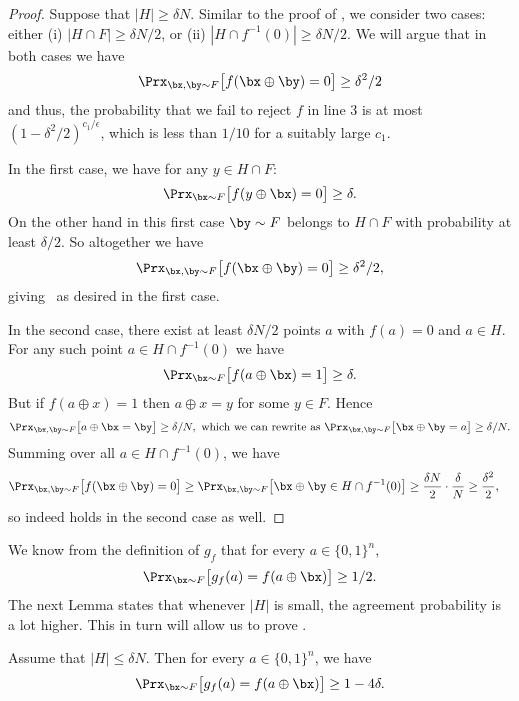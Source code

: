 \documentclass[11pt]{article}
\theoremstyle{definition}
\begin{document}
\begin{proof}
Suppose that $|H| \geq \delta  N$. Similar to the proof of  , we consider two cases: either (i)  $|H \cap F| \geq \delta N /2$, or
(ii) $|H \cap f^{-1}(0)| \geq \delta N /2$.
We will argue that in both cases we have
\begin{equation} \label{eq:xyz}
\Prx_{\bx,\by \sim F}\big[f(\bx \oplus \by)=0\big] \geq \delta^2/2
\end{equation}
and thus, the probability that we fail to reject $f$ in line $3$ is at most $(1-\delta^2/2)^{c_1/\epsilon}$, which is less than $1/10$ for a suitably large $c_1$.

In the first case, we have for any $y \in H \cap F$:
$$\Prx_{\bx \sim F}\big[f(y \oplus \bx)=0\big] \geq {\delta}.
$$ 
On the other hand in this first case $\by \sim F$ belongs to $H \cap F$ with probability at least ${\delta/2}$. So altogether we have 
$$\Prx_{\bx,\by \sim F}\big[f(\bx \oplus \by)=0\big] \geq \delta^2/2,$$
giving~ as desired in the first case.
    
In the second case, there exist at least $\delta N /2$ points $a$ with $f(a)=0$ and $a \in H$. For any such point $a \in H \cap f^{-1}(0)$ we have
    $$\Prx_{\bx \sim F}\big[f(a \oplus \bx)=1\big] \geq \delta.$$
    But if $f(a \oplus x)=1$ then $a \oplus x = y$ for some $y \in F$. Hence
    $$\Prx_{\bx, \by \sim F}\big[a \oplus \bx  = \by \big] \geq \delta/N,
\text{~which we can rewrite as~}
\Prx_{\bx,\by \sim F}\big[\bx \oplus \by = a \big] \geq \delta/N.$$
    Summing over all $a \in H \cap f^{-1}(0)$, we have 
\begin{align*}
    \Prx_{\bx,\by \sim F}\big[f(\bx \oplus \by)=0\big]
     &\ge \Prx_{\bx,\by \sim F}\big[ \bx \oplus \by\in H\cap f^{-1}(0)\big]\ge \frac{\delta N}{2}\cdot \frac{\delta}{N}\ge \frac{\delta^2}{2},\end{align*}
so indeed  holds in the second case as well.
\end{proof}






We know from the definition of $g_f$ that for every $a \in \{0,1\}^n$, $$\Prx_{\bx \sim F} \big[g_f(a)=f(a \oplus \bx)\big] \geq 1/2.$$
The next Lemma states that whenever $|H|$ is small, the agreement probability is a lot higher. This in turn will allow us to prove . 


\begin{lemma} 
\label{lem:amplification}
    Assume that $|H| \leq \delta N$. Then for every $a \in \{0,1\}^n$,  we have  
    $$\Prx_{\bx \sim F}\big[g_f(a) = f(a \oplus \bx)\big] \geq 1- 4 \delta.$$
\end{lemma}
\end{document}
